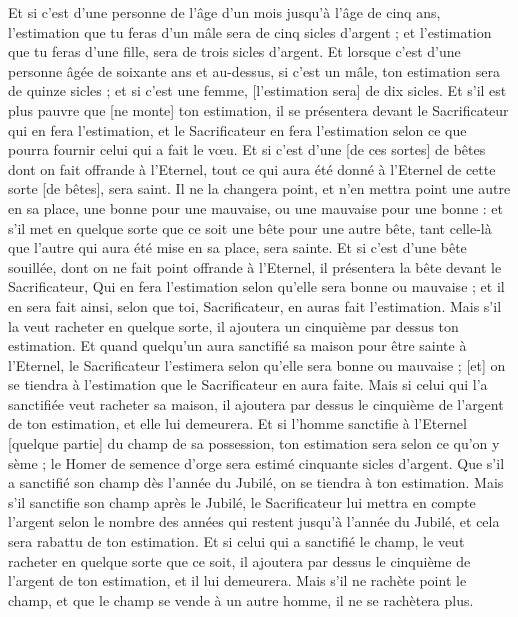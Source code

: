 \begin{multicols}{2}
Et si c'est d'une personne de l'âge d'un mois jusqu'à l'âge de cinq ans, l'estimation que tu feras d'un mâle sera de cinq sicles d'argent ; et l'estimation que tu feras d'une fille, sera de trois sicles d'argent.
Et lorsque c'est d'une personne âgée de soixante ans et au-dessus, si c'est un mâle, ton estimation sera de quinze sicles ; et si c'est une femme, [l'estimation sera] de dix sicles.
Et s'il est plus pauvre que [ne monte] ton estimation, il se présentera devant le Sacrificateur qui en fera l'estimation, et le Sacrificateur en fera l'estimation selon ce que pourra fournir celui qui a fait le vœu.
Et si c'est d'une [de ces sortes] de bêtes dont on fait offrande à l'Eternel, tout ce qui aura été donné à l'Eternel de cette sorte [de bêtes], sera saint.
Il ne la changera point, et n'en mettra point une autre en sa place, une bonne pour une mauvaise, ou une mauvaise pour une bonne : et s'il met en quelque sorte que ce soit une bête pour une autre bête, tant celle-là que l'autre qui aura été mise en sa place, sera sainte.
Et si c'est d'une bête souillée, dont on ne fait point offrande à l'Eternel, il présentera la bête devant le Sacrificateur,
Qui en fera l'estimation selon qu'elle sera bonne ou mauvaise ; et il en sera fait ainsi, selon que toi, Sacrificateur, en auras fait l'estimation.
Mais s'il la veut racheter en quelque sorte, il ajoutera un cinquième par dessus ton estimation.
Et quand quelqu'un aura sanctifié sa maison pour être sainte à l'Eternel, le Sacrificateur l'estimera selon qu'elle sera bonne ou mauvaise ; [et] on se tiendra à l'estimation que le Sacrificateur en aura faite.
Mais si celui qui l'a sanctifiée veut racheter sa maison, il ajoutera par dessus le cinquième de l'argent de ton estimation, et elle lui demeurera.
Et si l'homme sanctifie à l'Eternel [quelque partie] du champ de sa possession, ton estimation sera selon ce qu'on y sème ; le Homer de semence d'orge sera estimé cinquante sicles d'argent.
Que s'il a sanctifié son champ dès l'année du Jubilé, on se tiendra à ton estimation.
Mais s'il sanctifie son champ après le Jubilé, le Sacrificateur lui mettra en compte l'argent selon le nombre des années qui restent jusqu'à l'année du Jubilé, et cela sera rabattu de ton estimation.
Et si celui qui a sanctifié le champ, le veut racheter en quelque sorte que ce soit, il ajoutera par dessus le cinquième de l'argent de ton estimation, et il lui demeurera.
Mais s'il ne rachète point le champ, et que le champ se vende à un autre homme, il ne se rachètera plus.

\end{multicols}
